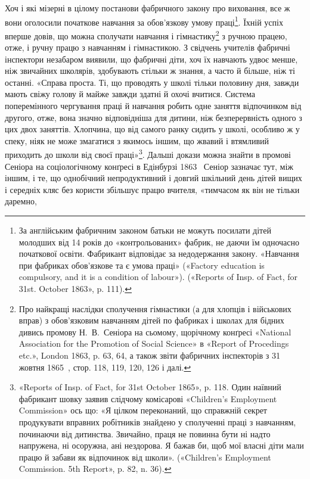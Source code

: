 
Хоч і які мізерні в цілому постанови фабричного закону про
виховання, все ж вони оголосили початкове навчання за обов’язкову
умову праці\footnote{
За англійським фабричним законом батьки не можуть посилати
дітей молодших від 14 років до «контрольованих» фабрик, не даючи
їм одночасно початкової освіти. Фабрикант відповідає за недодержання
закону. «Навчання при фабриках обов'язкове та є умова праці» («Factory
education is compulsory, and it is a condition of labour»). («Reports of
Insp. of Fact, for 31st. October 1863», p. 111).
}. Їхній успіх вперше довів, що можна сполучати
навчання і гімнастику\footnote{
Про найкращі наслідки сполучення гімнастики (а для хлопців
і військових вправ) з обов’язковим навчанням дітей по фабриках і школах
для бідних дивись промову Н.~В.~Сеніора на сьомому, щорічному конґресі
«National Association for the Promotion of Social Science» в «Report
of Procedings etc.», London 1863, p. 63, 64, а також звіти фабричних інспекторів
з 31 жовтня 1865~, стор. 118, 119, 120, 126 і далі.
} з ручною працею, отже, і ручну
працю з навчанням і гімнастикою. З свідчень учителів фабричні
інспектори незабаром виявили, що фабричні діти, хоч їх навчають
удвоє менше, ніж звичайних школярів, здобувають стільки ж
знання, а часто й більше, ніж ті останні. «Справа проста. Ті, що
проводять у школі тільки половину дня, завжди мають свіжу
голову й майже завжди здатні й охочі вчитися. Система поперемінного
чергування праці й навчання робить одне заняття відпочинком
від другого, отже, вона значно відповідніша для дитини,
ніж безперервність одного з цих двох заняттів. Хлопчина, що від
самого ранку сидить у школі, особливо ж у спеку, ніяк не може
змагатися з якимось іншим, що жвавий і втямливий приходить до
школи від своєї праці»\footnote{
«Reports of Insp. of Fact, for 31st October 1865», p. 118. Один
наївний фабрикант шовку заявив слідчому комісарові «Children’s Employment
Commission» ось що: «Я цілком переконаний, що справжній секрет
продукувати вправних робітників знайдено у сполученні праці з навчанням,
починаючи від дитинства. Звичайно, праця не повинна бути ні
надто напружена, ні осоружна, ані нездорова. Я бажав би, щоб мої
власні діти мали працю й забави як відпочинок від школи». («Children’s
Employment Commission. 5th Report», p. 82, n. 36).
}. Дальші докази можна знайти в промові
Сеніора на соціологічному конґресі в Едінбурзі 1863~ Сеніор
зазначає тут, між іншим, і те, що однобічний непродуктивний і
довгий шкільний день дітей вищих і середніх кляс без користи
збільшує працю вчителя, «тимчасом як він не тільки даремно,

